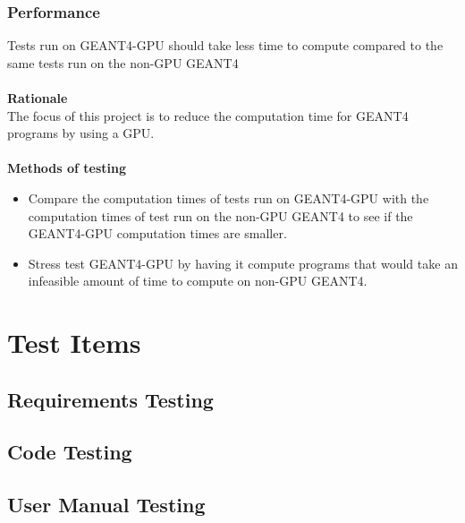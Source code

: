 \documentclass[12pt]{article}
\begin{document}
\subsubsection{Performance}
Tests run on GEANT4-GPU should take less time to compute compared to the same tests run on the non-GPU GEANT4\\\\
\textbf{Rationale}\\
The focus of this project is to reduce the computation time for GEANT4 programs by using a GPU. \\\\
\textbf{Methods of testing}
\begin{itemize}
\item Compare the computation times of tests run on GEANT4-GPU with the computation times of test run on the non-GPU GEANT4 to see if the GEANT4-GPU computation times are smaller.
\item Stress test GEANT4-GPU by having it compute programs that would take an infeasible amount of time to compute on non-GPU GEANT4.
\end{itemize}

\section{Test Items}

\subsection{Requirements Testing} %

\subsection{Code Testing} %

\subsection{User Manual Testing} %

\end{document}
